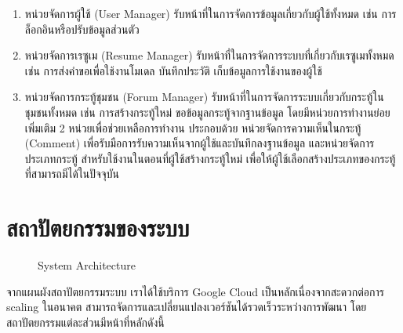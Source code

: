 \begin{enumerate}
    \item หน่วยจัดการผู้ใช้ (User Manager) รับหน้าที่ในการจัดการข้อมูลเกี่ยวกับผู้ใช้ทั้งหมด เช่น การล็อกอินหรือปรับข้อมูลส่วนตัว
    \item หน่วยจัดการเรซูเม (Resume Manager) รับหน้าที่ในการจัดการระบบที่เกี่ยวกับเรซูเมทั้งหมด เช่น การส่งคำขอเพื่อใช้งานโมเดล บันทึกประวัติ เก็บข้อมูลการใช้งานของผู้ใช้
    \item หน่วยจัดการกระทู้ชุมชน (Forum Manager) รับหน้าที่ในการจัดการระบบเกี่ยวกับกระทู้ในชุมชนทั้งหมด เช่น การสร้างกระทู้ใหม่ ขอข้อมูลกระทู้จากฐานข้อมูล
     โดยมีหน่วยการทำงานย่อยเพิ่มเติม 2 หน่วยเพื่อช่วยเหลือการทำงาน ประกอบด้วย หน่วยจัดการความเห็นในกระทู้ (Comment) เพื่อรับมือการรับความเห็นจากผู้ใช้และบันทึกลงฐานข้อมูล
     และหน่วยจัดการประเภทกระทู้ สำหรับใช้งานในตอนที่ผู้ใช้สร้างกระทู้ใหม่ เพื่อให้ผู้ใช้เลือกสร้างประเภทของกระทู้ที่สามารถมีได้ในปัจจุบัน
\end{enumerate}



\section{สถาปัตยกรรมของระบบ}
\begin{figure}[H]\centering
    \setlength{\fboxrule}{0.2mm} %
    \setlength{\fboxsep}{0.5cm}
    \caption{System Architecture}\label{fig:system_architecture}
\end{figure}
จากแผนผังสถาปัตยกรรมระบบ เราได้ใช้บริการ Google Cloud เป็นหลักเนื่องจากสะดวกต่อการ scaling ในอนาคต สามารถจัดการและเปลี่ยนแปลงเวอร์ชันได้รวดเร็วระหว่างการพัฒนา โดยสถาปัตยกรรมแต่ละส่วนมีหน้าที่หลักดังนี้

